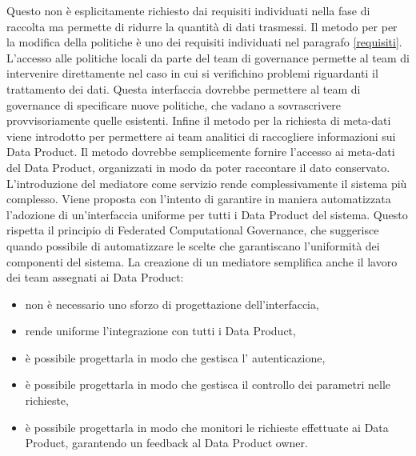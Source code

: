 \documentclass[12pt]{report}
\begin{document}
Questo non è esplicitamente richiesto dai requisiti individuati nella fase di raccolta ma permette di ridurre la quantità di dati trasmessi.
Il metodo per per la modifica della politiche è uno dei requisiti individuati nel paragrafo \ref{requisiti}.
L'accesso alle politiche locali da parte del team di governance permette al team di intervenire direttamente nel caso in cui si verifichino problemi riguardanti il trattamento dei dati.
Questa interfaccia dovrebbe permettere al team di governance di specificare nuove politiche, che vadano a sovrascrivere provvisoriamente quelle esistenti.
Infine il metodo per la richiesta di meta-dati viene introdotto per permettere ai team analitici di raccogliere informazioni sui Data Product.
Il metodo dovrebbe semplicemente fornire l'accesso ai meta-dati del Data Product, organizzati in modo da poter raccontare il dato conservato.
L'introduzione del mediatore come servizio rende complessivamente il sistema più complesso.
Viene proposta con l'intento di garantire in maniera automatizzata l'adozione di un'interfaccia uniforme per tutti i Data Product del sistema.
Questo rispetta il principio di Federated Computational Governance, che suggerisce quando possibile di automatizzare le scelte che garantiscano l'uniformità dei componenti del sistema.
La creazione di un mediatore semplifica anche il lavoro dei team assegnati ai Data Product:
\begin{itemize}
    \item non è necessario uno sforzo di progettazione dell'interfaccia, 
    \item rende uniforme l'integrazione con tutti i Data Product,
    \item è possibile progettarla in modo che gestisca l' autenticazione,
    \item è possibile progettarla in modo che gestisca il controllo dei parametri nelle richieste,
    \item è possibile progettarla in modo che monitori le richieste effettuate ai Data Product, garantendo un feedback al Data Product owner.
\end{itemize}
\end{document}
